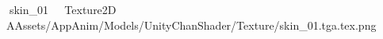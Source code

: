    skin_01            	   Texture2D
   A   Assets/AppAnim/Models/UnityChanShader/Texture/skin_01.tga.tex.png